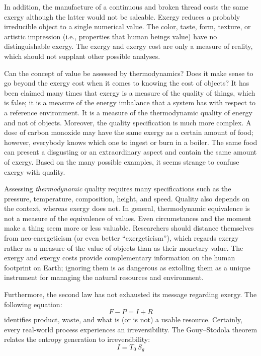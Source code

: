 \documentclass[energies,article,submit,moreauthors,pdftex]{Definitions/mdpi}
\begin{document}
In addition, the manufacture of a continuous and broken thread costs the same exergy although the latter would not be saleable. Exergy reduces a probably irreducible object to a single numerical value. The color, taste, form, texture, or artistic impression (i.e., properties that human beings value) have no distinguishable exergy. The exergy and exergy cost are only a measure of reality, which should not supplant other possible analyses.

Can the concept of value be assessed by thermodynamics? Does it make sense to go beyond the exergy cost when it comes to knowing the cost of objects? It has been claimed many times that exergy is a measure of the quality of things, which is false; it is a measure of the energy imbalance that a system has with respect to a reference environment. It is a measure of the thermodynamic quality of energy and not of objects. Moreover, the quality specification is much more complex. A dose of carbon monoxide may have the same exergy as a certain amount of food; however, everybody knows which one to ingest or burn in a boiler. The same food can present a disgusting or an extraordinary aspect and contain the same amount of exergy. Based on the many possible examples, it seems strange to confuse exergy with quality.

Assessing \emph{thermodynamic} quality requires many specifications such as the pressure, temperature, composition, height, and speed. Quality also depends on the context, whereas exergy does not. In general, thermodynamic equivalence is not a measure of the equivalence of values. Even circumstances and the moment make a thing seem more or less valuable. Researchers should distance themselves from neo-energeticism (or even better “exergeticism”), which regards exergy rather as a measure of the value of objects than as their monetary value. The exergy and exergy costs provide complementary information on the human footprint on Earth; ignoring them is as dangerous as extolling them as a unique instrument for managing the natural resources and environment.

Furthermore, the second law has not exhausted its message regarding exergy. The following equation:
\begin{equation}
   F - P = I + R
\label{eq:FPR}
\end{equation}
identifies product, waste, and what is (or is not) a usable resource. Certainly, every real-world process experiences an irreversibility. The Gouy–Stodola theorem relates the entropy generation to irreversibility:
\begin{equation}
    I = T_0\,S_g
\label{eq:gouystodola}
\end{equation}
\end{document}
